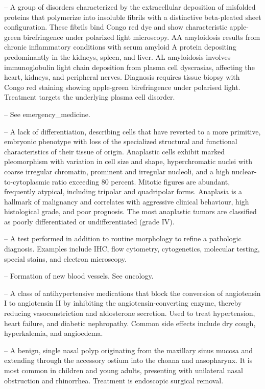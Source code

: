 -- A group of disorders characterized by the extracellular deposition of misfolded proteins that polymerize into insoluble fibrils with a distinctive beta-pleated sheet configuration. These fibrils bind Congo red dye and show characteristic apple-green birefringence under polarized light microscopy. AA amyloidosis results from chronic inflammatory conditions with serum amyloid A protein depositing predominantly in the kidneys, spleen, and liver. AL amyloidosis involves immunoglobulin light chain deposition from plasma cell dyscrasias, affecting the heart, kidneys, and peripheral nerves. Diagnosis requires tissue biopsy with Congo red staining showing apple-green birefringence under polarised light. Treatment targets the underlying plasma cell disorder.

-- See emergency\_medicine.

-- A lack of differentiation, describing cells that have reverted to a more primitive, embryonic phenotype with loss of the specialized structural and functional characteristics of their tissue of origin. Anaplastic cells exhibit marked pleomorphism with variation in cell size and shape, hyperchromatic nuclei with coarse irregular chromatin, prominent and irregular nucleoli, and a high nuclear-to-cytoplasmic ratio exceeding 80 percent. Mitotic figures are abundant, frequently atypical, including tripolar and quadripolar forms. Anaplasia is a hallmark of malignancy and correlates with aggressive clinical behaviour, high histological grade, and poor prognosis. The most anaplastic tumors are classified as poorly differentiated or undifferentiated (grade IV).

-- A test performed in addition to routine morphology to refine a pathologic diagnosis. Examples include IHC, flow cytometry, cytogenetics, molecular testing, special stains, and electron microscopy.

-- Formation of new blood vessels. See oncology.

-- A class of antihypertensive medications that block the conversion of angiotensin I to angiotensin II by inhibiting the angiotensin-converting enzyme, thereby reducing vasoconstriction and aldosterone secretion. Used to treat hypertension, heart failure, and diabetic nephropathy. Common side effects include dry cough, hyperkalemia, and angioedema.

-- A benign, single nasal polyp originating from the maxillary sinus mucosa and extending through the accessory ostium into the choana and nasopharynx. It is most common in children and young adults, presenting with unilateral nasal obstruction and rhinorrhea. Treatment is endoscopic surgical removal.

